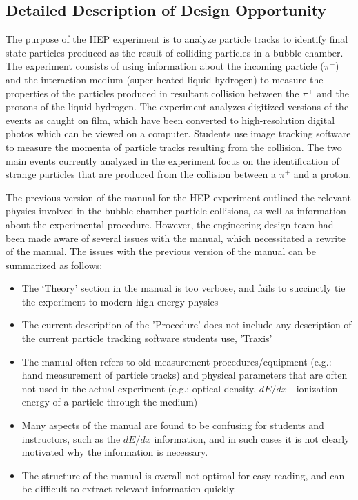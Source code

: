 \documentclass[12pt]{article} %
\begin{document}
\subsection{Detailed Description of Design Opportunity}\label{Design Opportunity_Manual}

The purpose of the HEP experiment is to analyze particle tracks to identify final state particles produced as the result of colliding particles in a bubble chamber. The experiment consists of using information about the incoming particle ($\pi^+$) and the interaction medium (super-heated liquid hydrogen) to measure the properties of the particles produced in resultant collision between the $\pi^+$ and the protons of the liquid hydrogen. The experiment analyzes digitized versions of the events as caught on film, which have been converted to high-resolution digital photos which can be viewed on a computer. Students use image tracking software to measure the momenta of particle tracks resulting from the collision. The two main events currently analyzed in the experiment focus on the identification of strange particles that are produced from the collision between a $\pi^+$ and a proton.
\newline

The previous version of the manual for the HEP experiment outlined the relevant physics involved in the bubble chamber particle collisions, as well as information about the experimental procedure. However, the engineering design team had been made aware of several issues with the manual, which necessitated a rewrite of the manual. The issues with the previous version of the manual can be summarized as follows:

\begin{itemize}
    \item The `Theory' section in the manual is too verbose, and fails to succinctly tie the experiment to modern high energy physics
    \item The current description of the 'Procedure' does not include any description of the current particle tracking software students use, 'Traxis'
    \item The manual often refers to old measurement procedures/equipment (e.g.: hand measurement of particle tracks) and physical parameters that are often not used in the actual experiment (e.g.: optical density, $dE/dx$ - ionization energy of a particle through the medium)
    \item Many aspects of the manual are found to be confusing for students and instructors, such as the $dE/dx$ information, and in such cases it is not clearly motivated why the information is necessary.
    \item The structure of the manual is overall not optimal for easy reading, and can be difficult to extract relevant information quickly.
\end{itemize}
\end{document}
